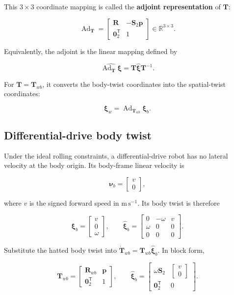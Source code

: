 \documentclass[
  australian,
  12pt,
  letterpaper,
  DIV=11,
  numbers=noendperiod,
  twoside]{scrreprt}
\begin{document}
This \(3\times3\) coordinate mapping is called the \textbf{adjoint
representation} of \(\mathbf T\):

\[
\boxed{
\operatorname{Ad}_{\mathbf T}
=
\begin{bmatrix}
\mathbf R&-\mathbf S_2\mathbf p\\
\mathbf 0_2^\mathsf T&1
\end{bmatrix}
\in\mathbb R^{3\times3}
}.
\]

Equivalently, the adjoint is the linear mapping defined by

\[
\widehat{
\operatorname{Ad}_{\mathbf T}\boldsymbol\xi
}
=
\mathbf T\widehat{\boldsymbol\xi}\mathbf T^{-1}.
\]

For \(\mathbf T=\mathbf T_{wb}\), it converts the body-twist coordinates
into the spatial-twist coordinates:

\[
\boxed{
\boldsymbol\xi_w
=
\operatorname{Ad}_{\mathbf T_{wb}}
\boldsymbol\xi_b
}.
\]

\subsection{Differential-drive body
twist}\label{differential-drive-body-twist}

Under the ideal rolling constraints, a differential-drive robot has no
lateral velocity at the body origin. Its body-frame linear velocity is

\[
\boldsymbol\nu_b
=
\begin{bmatrix}
v\\0
\end{bmatrix},
\]

where \(v\) is the signed forward speed in \(\mathrm{m\,s^{-1}}\). Its
body twist is therefore

\[
\boxed{
\boldsymbol\xi_b
=
\begin{bmatrix}
v\\0\\\omega
\end{bmatrix},
\qquad
\widehat{\boldsymbol\xi}_b
=
\begin{bmatrix}
0&-\omega&v\\
\omega&0&0\\
0&0&0
\end{bmatrix}
}.
\]

Substitute the hatted body twist into
\(\dot{\mathbf T}_{wb}=\mathbf T_{wb}\widehat{\boldsymbol\xi}_b\). In
block form,

\[
\mathbf T_{wb}
=
\begin{bmatrix}
\mathbf R_{wb}&\mathbf p\\
\mathbf 0_2^\mathsf T&1
\end{bmatrix},
\qquad
\widehat{\boldsymbol\xi}_b
=
\begin{bmatrix}
\omega\mathbf S_2&
\begin{bmatrix}
v\\0
\end{bmatrix}\\
\mathbf 0_2^\mathsf T&0
\end{bmatrix}.
\]
\end{document}
